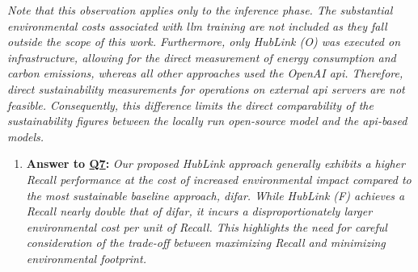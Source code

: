 \textit{Note that this observation applies only to the inference phase. The substantial environmental costs associated with \gls{llm} training are not included as they fall outside the scope of this work. Furthermore, only HubLink (O) was executed on infrastructure, allowing for the direct measurement of energy consumption and carbon emissions, whereas all other approaches used the OpenAI \gls{api}. Therefore, direct sustainability measurements for operations on external \gls{api} servers are not feasible. Consequently, this difference limits the direct comparability of the sustainability figures between the locally run open-source model and the \gls{api}-based models.}

\begin{enumerate}[label={}]
    \item \textbf{Answer to \hyperref[sec:evaluation_gqm_plan]{Q7}:} \textit{Our proposed HubLink approach generally exhibits a higher Recall performance at the cost of increased environmental impact compared to the most sustainable baseline approach, \gls{difar}. While HubLink (F) achieves a Recall nearly double that of \gls{difar}, it incurs a disproportionately larger environmental cost per unit of Recall. This highlights the need for careful consideration of the trade-off between maximizing Recall and minimizing environmental footprint.}
\end{enumerate}